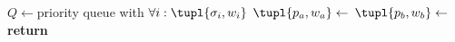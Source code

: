 \begin{algorithmic}
\State $Q\gets $priority queue with $\forall i:\tupl{\sigma_i,w_i}$
\State $\tupl{p_a,w_a}\gets$
\State $\tupl{p_b,w_b}\gets$
\State {}
\EndWhile
\State \textbf{return} 
\EndFunction
\end{algorithmic}